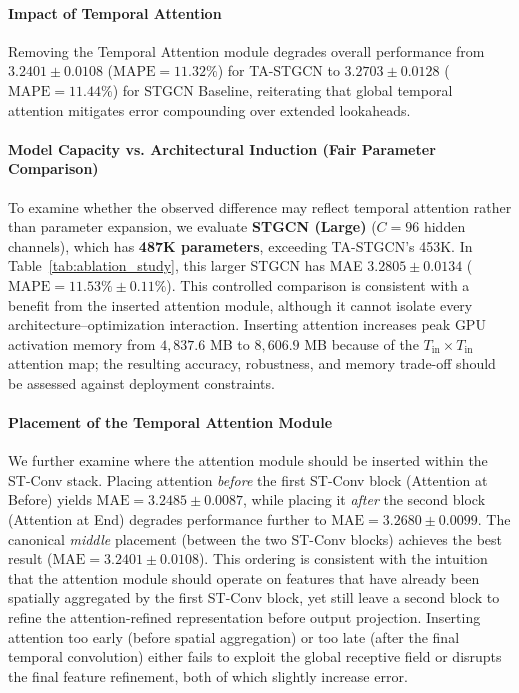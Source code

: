 \documentclass[a4paper,fleqn]{cas-sc}
\begin{document}
\paragraph{Impact of Temporal Attention} Removing the Temporal Attention module degrades overall performance from $3.2401 \pm 0.0108$ ($\text{MAPE} = 11.32\%$) for TA-STGCN to $3.2703 \pm 0.0128$ ($\text{MAPE} = 11.44\%$) for STGCN Baseline, reiterating that global temporal attention mitigates error compounding over extended lookaheads.

\paragraph{Model Capacity vs. Architectural Induction (Fair Parameter Comparison)} To examine whether the observed difference may reflect temporal attention rather than parameter expansion, we evaluate \textbf{STGCN (Large)} ($C=96$ hidden channels), which has \textbf{487K parameters}, exceeding TA-STGCN's 453K. In Table~\ref{tab:ablation_study}, this larger STGCN has MAE $3.2805 \pm 0.0134$ ($\text{MAPE} = 11.53\% \pm 0.11\%$). This controlled comparison is consistent with a benefit from the inserted attention module, although it cannot isolate every architecture--optimization interaction. Inserting attention increases peak GPU activation memory from $4,837.6$ MB to $8,606.9$ MB because of the $T_{\text{in}} \times T_{\text{in}}$ attention map; the resulting accuracy, robustness, and memory trade-off should be assessed against deployment constraints.

\paragraph{Placement of the Temporal Attention Module} We further examine where the attention module should be inserted within the ST-Conv stack. Placing attention \emph{before} the first ST-Conv block (Attention at Before) yields $\text{MAE} = 3.2485 \pm 0.0087$, while placing it \emph{after} the second block (Attention at End) degrades performance further to $\text{MAE} = 3.2680 \pm 0.0099$. The canonical \emph{middle} placement (between the two ST-Conv blocks) achieves the best result ($\text{MAE} = 3.2401 \pm 0.0108$). This ordering is consistent with the intuition that the attention module should operate on features that have already been spatially aggregated by the first ST-Conv block, yet still leave a second block to refine the attention-refined representation before output projection. Inserting attention too early (before spatial aggregation) or too late (after the final temporal convolution) either fails to exploit the global receptive field or disrupts the final feature refinement, both of which slightly increase error.
\end{document}
